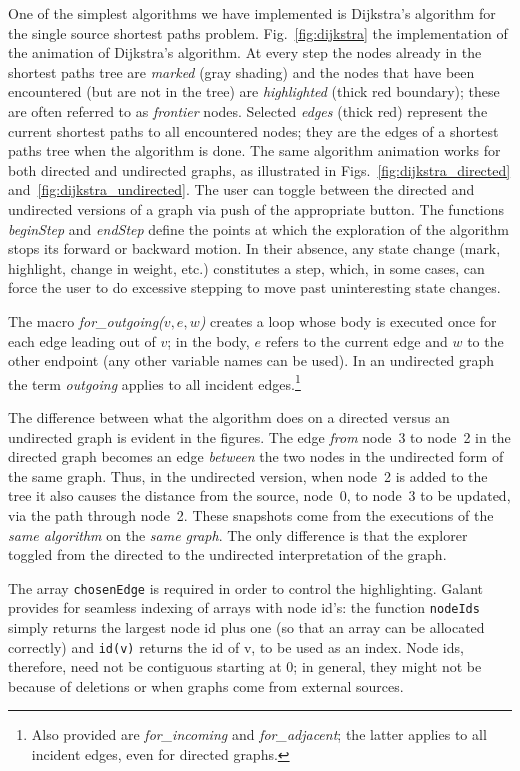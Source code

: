 One of the simplest algorithms we have implemented is Dijkstra's algorithm
for the single source shortest paths problem.
Fig.~\ref{fig:dijkstra}
the implementation of the animation of Dijkstra's algorithm.
At every step the nodes already in the shortest paths tree are \emph{marked}
(gray shading) and the nodes that have been encountered (but are not in the tree)
are \emph{highlighted} (thick red boundary); these are often referred to as
\emph{frontier} nodes.
Selected \emph{edges} (thick red) represent the current shortest paths to all
encountered nodes;
they are the edges of a shortest paths tree when the algorithm is done.
The same algorithm animation
works for both directed and undirected graphs, as illustrated
in Figs.~\ref{fig:dijkstra_directed} and~\ref{fig:dijkstra_undirected}.
The user can toggle between the directed and undirected versions of a graph
via push of the appropriate button.
The functions \emph{beginStep} and \emph{endStep} define the points at which
the exploration of the algorithm stops its forward or backward motion.
In their absence, any state change (mark, highlight, change in weight, etc.)
constitutes a step, which, in some cases, can force the user
to do excessive stepping to move past uninteresting state changes.







The macro \emph{for\_outgoing($v,e,w$)}
creates a loop whose body is executed once
for each edge leading out of $v$; in the body, $e$ refers to the current edge
and $w$ to the other endpoint (any other variable names can be used).
In an undirected graph the term \emph{outgoing} applies to all incident
edges.\footnote{
Also provided are \emph{for\_incoming} and \emph{for\_adjacent};
the latter applies to all incident edges, even for directed graphs.
}

The difference between what the algorithm does on a directed versus an undirected graph is evident in the figures.
The edge \emph{from} node~3 to node~2 in the directed graph becomes an
edge \emph{between} the two nodes in the undirected form of the same graph.
Thus, in the undirected version, when node~2 is added to the tree
it also causes the distance from the source, node~0, to node~3 to be updated,
via the path through node~2.
These snapshots come from the executions of the \emph{same algorithm} on the
\emph{same graph}.
The only difference is that the explorer toggled from the directed to
the undirected
interpretation of the graph.

The array \verb+chosenEdge+ is required in order to control the highlighting.
Galant provides for seamless indexing of arrays with node id's: the
function \verb+nodeIds+ simply returns the largest node id plus one
(so that an array can be allocated correctly) and \verb+id(v)+ returns the
id of v, to be used as an index.
Node ids, therefore, need not be contiguous starting at 0;
in general, they might not be because of deletions or when graphs
come from external sources.
